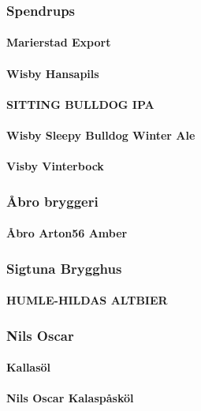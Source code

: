 \documentclass[11pt]{article}
\begin{document}
\subsubsection{Spendrups}
\label{sec:orgdc9f1b2}
\paragraph{Marierstad Export}
\label{sec:org134bd75}
\paragraph{Wisby Hansapils}
\label{sec:org446dc3c}
\paragraph{SITTING BULLDOG IPA}
\label{sec:org2e3f0a8}
\paragraph{Wisby Sleepy Bulldog Winter Ale}
\label{sec:org6e79a23}
\paragraph{Visby Vinterbock}
\label{sec:org3ddfe48}
\subsubsection{Åbro bryggeri}
\label{sec:org8b05c5b}
\paragraph{Åbro Arton56 Amber}
\label{sec:org6a85b6e}
\subsubsection{Sigtuna Brygghus}
\label{sec:org0aabf92}
\paragraph{HUMLE-HILDAS ALTBIER}
\label{sec:org307917e}
\subsubsection{Nils Oscar}
\label{sec:orgb66c353}
\paragraph{Kallasöl}
\label{sec:org81b711b}
\paragraph{Nils Oscar Kalaspåsköl}
\label{sec:orgbe1accc}
\end{document}
